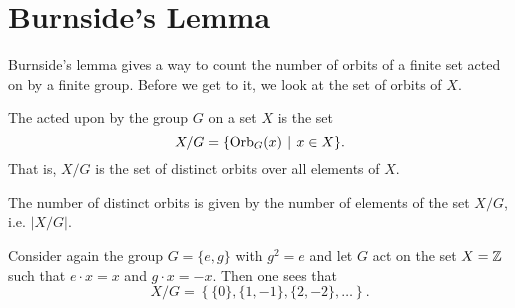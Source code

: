 \section{Burnside's Lemma}
Burnside's lemma gives a way to count the number of orbits of a finite set acted on by a finite group. Before we get to it, we look at the set of orbits of $X$.

\begin{definition}
    The  acted upon by the group $G$ on a set $X$ is the set
    \[
        X / G = \{\Orb{G}{x} \vert x \in X\}.
    \]
    That is, $X/G$ is the set of distinct orbits over all elements of $X$.
\end{definition}
\begin{remark}
    The number of distinct orbits is given by the number of elements of the set $X/G$, i.e. $|X/G|$.
\end{remark}

\begin{example}
    Consider again the group $G = \{e, g\}$ with $g^2 = e$ and let $G$ act on the set $X = \mathbb{Z}$ such that $e \cdot x = x$ and $g \cdot x = -x$. Then one sees that
    \[
        X/G = \left\{\{0\}, \{1, -1\}, \{2, -2\}, \dots\right\}.
    \]
\end{example}


